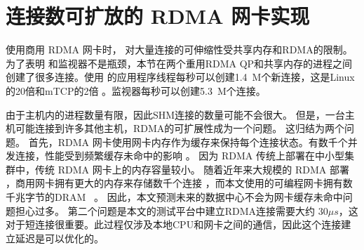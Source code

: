 \section{连接数可扩放的 RDMA 网卡实现}
\label{socksdirect:sec:discussion}




使用商用 RDMA 网卡时，\sys {} 对大量连接的可伸缩性受共享内存和RDMA的限制。
为了表明 \libipc {} 和监视器不是瓶颈，本节在两个重用RDMA QP和共享内存的进程之间创建了很多连接。使用 \libipc {} 的应用程序线程每秒可以创建1.4~M个新连接，这是Linux的20倍和mTCP的2倍 \cite {jeong2014mtcp}。监视器每秒可以创建5.3~M个连接。

由于主机内的进程数量有限，因此SHM连接的数量可能不会很大。
但是，一台主机可能连接到许多其他主机，RDMA的可扩展性成为一个问题。
这归结为两个问题。
首先，RDMA 网卡使用网卡内存作为缓存来保持每个连接状态。有数千个并发连接，性能受到频繁缓存未命中的影响 \cite {mprdma,kaminsky2016design,kalia2018datacenter}。
因为 RDMA 传统上部署在中小型集群中，传统 RDMA 网卡上的内存容量较小。
随着近年来大规模的 RDMA 部署 \cite {guo2016rdma}，商用网卡拥有更大的内存来存储数千个连接 \cite {kalia2018datacenter}，而本文使用的可编程网卡拥有数千兆字节的DRAM~ \cite {mellanox-innova,mellanox-bluefield,smartnic}。
因此，本文预测未来的数据中心不会为网卡缓存未命中问题担心过多。
第二个问题是本文的测试平台中建立RDMA连接需要大约 $30 \mu s$，这对于短连接很重要。此过程仅涉及本地CPU和网卡之间的通信，因此这个连接建立延迟是可以优化的。

